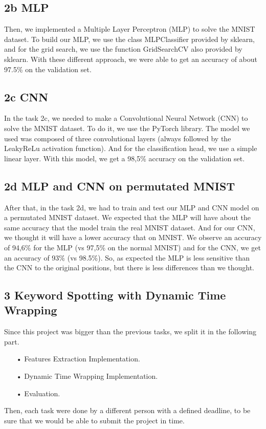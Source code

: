 \documentclass[12pt]{article}
\begin{document}
\subsection*{2b MLP}
Then, we implemented a Multiple Layer Perceptron (MLP) to solve the MNIST dataset. To build our MLP, we use the class MLPClassifier provided by sklearn, and for the grid search, we use the function GridSearchCV also provided by sklearn. With these different approach, we were able to get an accuracy of about 97.5\% on the validation set.
\subsection*{2c CNN}
In the task 2c, we needed to make a Convolutional Neural Network (CNN) to solve the MNIST dataset. To do it, we use the PyTorch library. The model we used was composed of three convolutional layers (always followed by the LeakyReLu activation function). And for the classification head, we use a simple linear layer.
With this model, we get a 98,5\% accuracy on the validation set.
\subsection*{2d MLP and CNN on permutated MNIST}
After that, in the task 2d, we had to train and test our MLP and CNN model on a permutated MNIST dataset. We expected that the MLP will have about the same accuracy that the model train  the real MNIST dataset. And for our CNN, we thought it will have a lower accuracy that on MNIST.
\newline We observe an accuracy of 94,6\% for the MLP (vs 97,5\% on the normal MNIST) and for the CNN, we get an accuracy of 93\% (vs 98.5\%). So, as expected the MLP is less sensitive than the CNN to the original positions, but there is less differences than we thought. 

\subsection*{3 Keyword Spotting with Dynamic Time Wrapping}
Since this project was bigger than the previous tasks, we split it in the following part. 
\begin{enumerate}
\item[•]Features Extraction Implementation.
\item[•]Dynamic Time Wrapping Implementation.
\item[•]Evaluation.
\end{enumerate}
Then, each task were done by a different person with a defined deadline, to be sure that we would be able to submit the project in time.
\end{document}
